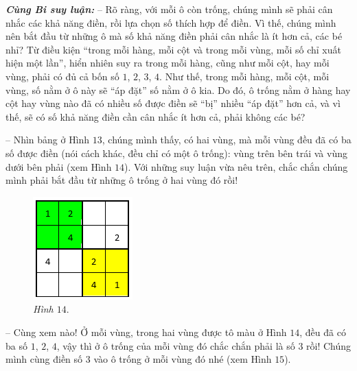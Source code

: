 	\textbf{\color{toancuabi}\textit{Cùng Bi suy luận:}}
	\vskip 0.1cm
	-- Rõ ràng, với mỗi ô còn trống, chúng mình sẽ phải cân nhắc các khả năng điền, rồi lựa chọn số thích hợp để điền. Vì thế, chúng mình nên bắt đầu từ những ô mà số khả năng điền phải cân nhắc là ít hơn cả, các bé nhỉ? Từ điều kiện
	“trong mỗi hàng, mỗi cột và trong mỗi vùng, mỗi số chỉ xuất hiện một lần”, hiển nhiên suy ra trong mỗi hàng, cũng như mỗi cột, hay mỗi vùng, phải có đủ cả bốn số $1$, $2$, $3$, $4$. Như thế, trong mỗi hàng, mỗi cột, mỗi vùng, số nằm ở ô này sẽ “áp đặt” số nằm ở ô kia. Do đó, ô trống nằm ở hàng hay cột hay vùng nào đã có nhiều số được điền sẽ “bị” nhiều “áp đặt” hơn cả, và vì thế, sẽ có số khả năng điền cần cân nhắc ít hơn cả, phải không các bé?
	\vskip 0.1cm
	\begin{multicols}{2}
		-- Nhìn bảng ở Hình $13$, chúng mình thấy, có hai vùng, mà mỗi vùng đều đã có ba số được điền (nói cách khác, đều chỉ có một ô trống): vùng trên bên trái và vùng dưới bên phải (xem Hình $14$). Với những suy luận vừa nêu trên, chắc chắn chúng mình phải bắt đầu từ những ô trống ở hai vùng đó rồi!
		\begin{figure}[H]
			\centering
			\vspace*{-10pt}
			\captionsetup{labelformat= empty, justification=centering}
			\includegraphics[scale=0.8]{pic3}
			\caption{\small\textit{Hình $14.$}}
		\end{figure}
	\end{multicols}
	\vspace*{-5pt}
		-- Cùng xem nào! Ở mỗi vùng, trong hai vùng được tô màu ở Hình $14$, đều đã có ba số $1$, $2$, $4$, vậy thì ở ô trống của mỗi vùng đó chắc chắn phải là số $3$ rồi! Chúng mình cùng điền số $3$ vào ô trống ở mỗi vùng đó nhé (xem Hình $15$).
		\vskip 0.1cm
